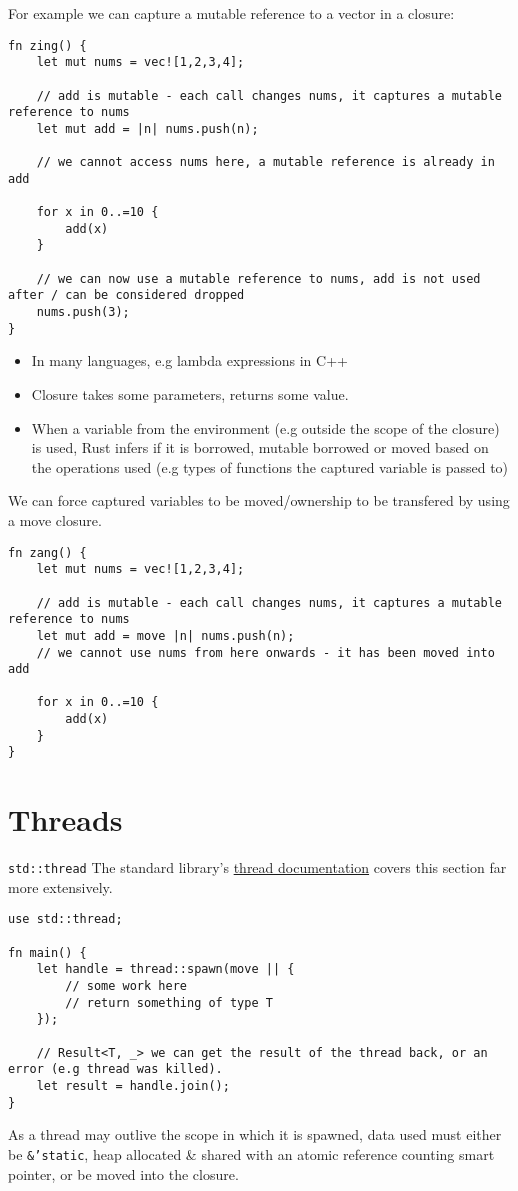 For example we can capture a mutable reference to a vector in a closure:
\begin{verbatim}
fn zing() {
    let mut nums = vec![1,2,3,4];

    // add is mutable - each call changes nums, it captures a mutable reference to nums
    let mut add = |n| nums.push(n);

    // we cannot access nums here, a mutable reference is already in add
    
    for x in 0..=10 {
        add(x)
    }
    
    // we can now use a mutable reference to nums, add is not used after / can be considered dropped
    nums.push(3);
}
\end{verbatim}

\begin{itemize}
    \item In many languages, e.g lambda expressions in C++
    \item Closure takes some parameters, returns some value.
    \item When a variable from the environment (e.g outside the scope of the closure) is used, Rust infers if it is borrowed, mutable borrowed or moved based on the operations used (e.g types of functions the captured variable is passed to)
\end{itemize}
We can force captured variables to be moved/ownership to be transfered by using a move closure.
\begin{verbatim}
fn zang() {
    let mut nums = vec![1,2,3,4];

    // add is mutable - each call changes nums, it captures a mutable reference to nums
    let mut add = move |n| nums.push(n);
    // we cannot use nums from here onwards - it has been moved into add
    
    for x in 0..=10 {
        add(x)
    }
}
\end{verbatim}

\section{Threads}
\begin{sidenotebox}{\texttt{std::thread}}
    The standard library's \href{https://doc.rust-lang.org/std/thread/}{thread documentation} covers this section far more extensively.
\end{sidenotebox}
\begin{verbatim}
use std::thread;

fn main() {
    let handle = thread::spawn(move || {
        // some work here
        // return something of type T
    });

    // Result<T, _> we can get the result of the thread back, or an error (e.g thread was killed).
    let result = handle.join();
}
\end{verbatim}

As a thread may outlive the scope in which it is spawned, data used must either be \texttt{&'static}, heap allocated \& shared with an atomic reference counting smart pointer, or be moved into the closure.
\unfinished
